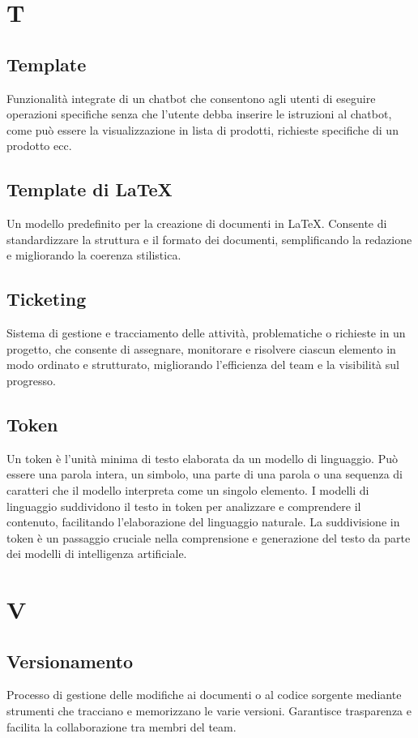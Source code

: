 \documentclass{article}
\begin{document}
\newpage
\section{T}

\subsection{Template}
Funzionalità integrate di un chatbot che consentono agli utenti di eseguire operazioni specifiche senza che l'utente debba inserire le istruzioni al chatbot, come può essere la visualizzazione in lista di prodotti, richieste specifiche di un prodotto ecc.

\subsection{Template di LaTeX}
Un modello predefinito per la creazione di documenti in LaTeX. Consente di standardizzare la struttura e il formato dei documenti, semplificando la redazione e migliorando la coerenza stilistica.

\subsection{Ticketing}
Sistema di gestione e tracciamento delle attività, problematiche o richieste in un progetto, che consente di assegnare, monitorare e risolvere ciascun elemento in modo ordinato e strutturato, migliorando l'efficienza del team e la visibilità sul progresso.
 
\subsection{Token}
Un token è l'unità minima di testo elaborata da un modello di linguaggio. Può essere una parola intera, un simbolo, una parte di una parola o una sequenza di caratteri che il modello interpreta come un singolo elemento. I modelli di linguaggio suddividono il testo in token per analizzare e comprendere il contenuto, facilitando l'elaborazione del linguaggio naturale. La suddivisione in token è un passaggio cruciale nella comprensione e generazione del testo da parte dei modelli di intelligenza artificiale.
\newpage

\section{V}

\subsection{Versionamento}
Processo di gestione delle modifiche ai documenti o al codice sorgente mediante strumenti che tracciano e memorizzano le varie versioni. Garantisce trasparenza e facilita la collaborazione tra membri del team.
\end{document}
